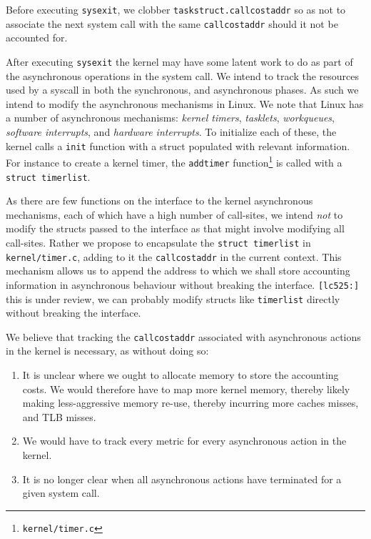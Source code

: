 \documentclass[12pt]{article}
\def\_{\textunderscore\-}
\begin{document}
  Before executing \texttt{sysexit}, we clobber \texttt{task\_struct.call\_cost\_addr} so as not to associate the next system call with the same \texttt{call\_cost\_addr} should it not be accounted for.

  After executing \texttt{sysexit} the kernel may have some latent work to do as part of the asynchronous operations in the system call. We intend to track the resources used by a syscall in both the synchronous, and asynchronous phases. As such we intend to modify the asynchronous mechanisms in Linux.  We note that Linux has a number of asynchronous mechanisms: \emph{kernel timers}, \emph{tasklets}, \emph{workqueues}, \emph{software interrupts}, and \emph{hardware interrupts}. To initialize each of these, the kernel calls a \texttt{\_\_init} function with a struct populated with relevant information. For instance to create a kernel timer, the \texttt{add\_timer} function\footnote{\texttt{kernel/timer.c}} is called with a \texttt{struct timer\_list}.

  As there are few functions on the interface to the kernel asynchronous mechanisms, each of which have a high number of call-sites, we intend \emph{not} to modify the structs passed to the interface as that might involve modifying all call-sites. 
  Rather we propose to encapsulate the \texttt{struct timer\_list} in \texttt{kernel/timer.c}, adding to it the \texttt{call\_cost\_addr} in the current context.
  This mechanism allows us to append the address to which we shall store accounting information in asynchronous behaviour without breaking the interface. {\color{red}\texttt{[lc525:]} this is under review, we can probably modify structs like \texttt{timer\_list} directly without breaking the interface}.

  We believe that tracking the \texttt{call\_cost\_addr} associated with asynchronous actions in the kernel is necessary, as without doing so:
  \begin{enumerate}
  \item It is unclear where we ought to allocate memory to store the accounting costs. We would therefore have to map more kernel memory, thereby likely making less-aggressive memory re-use, thereby incurring more caches misses, and TLB misses.
  \item We would have to track every metric for every asynchronous action in the kernel.
  \item It is no longer clear when all asynchronous actions have terminated for a given system call.
  \end{enumerate}
  
\end{document}
